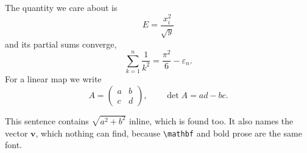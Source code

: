 \documentclass[11pt]{article}
\begin{document}
The quantity we care about is
\[
E = \frac{x_i^2}{\sqrt{y}}
\]
and its partial sums converge,
\[
\sum_{k=1}^{n} \frac{1}{k^2} = \frac{\pi^2}{6} - \varepsilon_n .
\]
For a linear map we write
\[
A = \begin{pmatrix} a & b \\ c & d \end{pmatrix},
\qquad
\det A = ad - bc .
\]

This sentence contains $\sqrt{a^2+b^2}$ inline, which is found too. It
also names the vector $\mathbf{v}$, which nothing can find, because
\verb|\mathbf| and bold prose are the same font.
\end{document}
